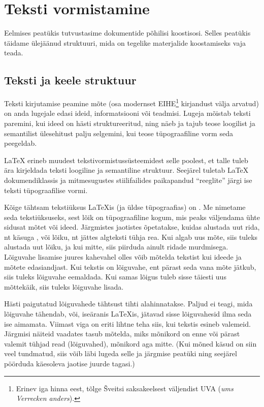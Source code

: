 \chapter{Teksti vormistamine}

\begin{intro}
  Eelmises peatükis tutvustasime \LaTeXe{} dokumentide põhilisi
  koostisosi.
  Selles peatükis täidame ülejäänud struktuuri, mida on
  tegelike materjalide koostamiseks vaja teada.
\end{intro}

\section{Teksti ja keele struktuur}
Teksti kirjutamise peamine mõte (osa modernset EIHE\footnote{Erinev iga
hinna eest, tõlge \v{S}veitsi saksakeelsest väljendist UVA (\emph{ums
Verrecken anders}).} kirjandust välja arvatud) on anda lugejale edasi
ideid, informatsiooni või teadmisi. Lugeja mõistab teksti paremini, kui
ideed on hästi struktureeritud, ning näeb ja tajub teose loogilist ja
semantilist ülesehitust palju selgemini, kui teose tüpograafiline vorm
seda peegeldab.

\LaTeX{} erineb muudest tekstivormistussüsteemidest selle poolest, et
talle tuleb ära kirjeldada teksti loogiline ja semantiline struktuur.
Seejärel tuletab \LaTeX{} dokumendiklassis ja mitmesugustes
stiilifailides paikapandud "`reeglite"' järgi ise teksti tüpograafilise
vormi.

Kõige tähtsam tekstiüksus \LaTeX is (ja üldse tüpograafias) on
. Me nimetame seda tekstiüksuseks, sest lõik on tüpograafiline
kogum, mis peaks väljendama ühte sidusat mõtet või ideed. Järgmistes
jaotistes õpetatakse, kuidas alustada uut rida, nt käsuga
\texttt{\bs\bs}, või lõiku, nt jättes algteksti tühja rea. Kui algab uus
mõte, siis tuleks alustada uut lõiku, ja kui mitte, siis piirduda ainult
ridade murdmisega. Lõiguvahe lisamise juures kahevahel olles võib
mõtelda tekstist kui ideede ja mõtete edasiandjast. Kui tekstis on
lõiguvahe, ent pärast seda vana mõte jätkub, siis tuleks lõiguvahe
eemaldada. Kui samas lõigus tuleb sisse täiesti uus mõttekäik, siis
tuleks lõiguvahe lisada.

Hästi paigutatud lõiguvahede tähtsust tihti alahinnatakse. Paljud ei
teagi, mida lõiguvahe tähendab, või, iseäranis \LaTeX is, jätavad sisse
lõiguvahesid ilma seda ise aimamata. Viimast viga on eriti lihtne teha
siis, kui tekstis esineb valemeid. Järgmisi näiteid vaadates tasub
mõtelda, miks mõnikord on enne või pärast valemit tühjad read
(lõiguvahed), mõnikord aga mitte. (Kui mõned käsud on siin veel
tundmatud, siis võib läbi lugeda selle ja järgmise peatüki ning seejärel
pöörduda käesoleva jaotise juurde tagasi.)

